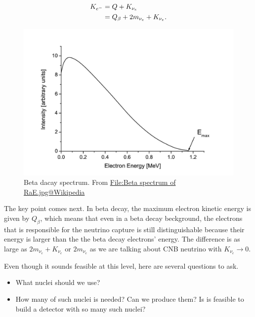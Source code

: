 \documentclass[letterpaper,12pt,english]{sphinxmanual}
\begin{document}
\begin{gather}
\begin{split}K_{e^-} &= Q + K_{\nu_e} \\
&= Q_\beta + 2 m_{\nu_e} + K_{\nu_e}.\end{split}\notag
\end{gather}\begin{figure}[htbp]
\centering
\capstart

\includegraphics{beta_spectrum_of_RaE.jpg}
\caption{Beta dacay spectrum. From \href{https://commons.wikimedia.org/wiki/File:Beta\_spectrum\_of\_RaE.jpg}{File:Beta spectrum of RaE.jpg@Wikipedia}}\end{figure}

The key point comes next. In beta decay, the maximum electron kinetic energy is given by \(Q_\beta\), which means that even in a beta decay beckground, the electrons that is responsible for the neutrino capture is still distinguishable because their energy is larger than the the beta decay electrons' energy. The difference is as large as \(2 m_{\nu_e} + K_{\nu_e}\) or \(2 m_{\nu_e}\) as we are talking about CNB neutrino with \(K_{\nu_e}\to 0\).

Even though it sounds feasible at this level, here are several questions to ask.
\begin{itemize}
\item {} 
What nuclei should we use?

\item {} 
How many of such nuclei is needed? Can we produce them? Is is feasible to build a detector with so many such nuclei?

\end{itemize}
\end{document}

